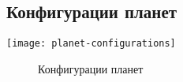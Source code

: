 \subsection{Конфигурации планет}
\begin{center}
\texttt{[image: planet-configurations]}
\begin{figure}[h!]
\caption{Конфигурации планет}
\end{figure}
\end{center}